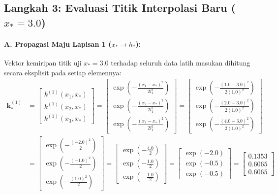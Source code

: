 \documentclass[11pt,a4paper]{article}
\begin{document}
\subsection{Langkah 3: Evaluasi Titik Interpolasi Baru (\texorpdfstring{$x_* = 3.0$}{x* = 3.0})}

\paragraph{A. Propagasi Maju Lapisan 1 ($x_* \to h_*$):}
Vektor kemiripan titik uji $x_* = 3.0$ terhadap seluruh data latih masukan dihitung secara eksplisit pada setiap elemennya:
\begin{align}
\mathbf{k}_*^{(1)} &= \begin{bmatrix} k^{(1)}(x_1, x_*) \\ k^{(1)}(x_2, x_*) \\ k^{(1)}(x_3, x_*) \end{bmatrix} = \begin{bmatrix} \exp\left(-\frac{(x_1 - x_*)^2}{2l_1^2}\right) \\ \exp\left(-\frac{(x_2 - x_*)^2}{2l_1^2}\right) \\ \exp\left(-\frac{(x_3 - x_*)^2}{2l_1^2}\right) \end{bmatrix} = \begin{bmatrix} \exp\left(-\frac{(1.0 - 3.0)^2}{2(1.0)^2}\right) \\ \exp\left(-\frac{(2.0 - 3.0)^2}{2(1.0)^2}\right) \\ \exp\left(-\frac{(4.0 - 3.0)^2}{2(1.0)^2}\right) \end{bmatrix} \nonumber \\
&= \begin{bmatrix} \exp\left(-\frac{(-2.0)^2}{2}\right) \\ \exp\left(-\frac{(-1.0)^2}{2}\right) \\ \exp\left(-\frac{(1.0)^2}{2}\right) \end{bmatrix} = \begin{bmatrix} \exp\left(-\frac{4.0}{2}\right) \\ \exp\left(-\frac{1.0}{2}\right) \\ \exp\left(-\frac{1.0}{2}\right) \end{bmatrix} = \begin{bmatrix} \exp(-2.0) \\ \exp(-0.5) \\ \exp(-0.5) \end{bmatrix} = \begin{bmatrix} \mathbf{0.1353} \\ \mathbf{0.6065} \\ \mathbf{0.6065} \end{bmatrix}
\end{align}
\end{document}
